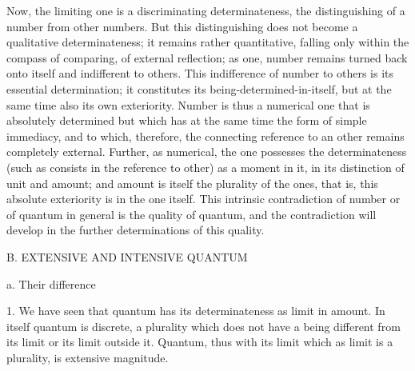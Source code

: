 Now, the limiting one is a discriminating determinateness,
the distinguishing of a number from other numbers.
But this distinguishing does not become
a qualitative determinateness;
it remains rather quantitative,
falling only within the compass
of comparing, of external reflection;
as one, number remains turned back onto itself
and indifferent to others.
This indifference of number to others
is its essential determination;
it constitutes its being-determined-in-itself,
but at the same time also its own exteriority.
Number is thus a numerical one that is absolutely determined
but which has at the same time the form of simple immediacy,
and to which, therefore, the connecting reference to
an other remains completely external.
Further, as numerical, the one possesses the determinateness
(such as consists in the reference to other) as a moment in it,
in its distinction of unit and amount;
and amount is itself the plurality of the ones,
that is, this absolute exteriority is in the one itself.
This intrinsic contradiction of number
or of quantum in general is the quality of quantum,
and the contradiction will develop in
the further determinations of this quality.

B. EXTENSIVE AND INTENSIVE QUANTUM

a. Their difference

1. We have seen that quantum has
its determinateness as limit in amount.
In itself quantum is discrete, a plurality
which does not have a being different
from its limit or its limit outside it.
Quantum, thus with its limit
which as limit is a plurality,
is extensive magnitude.


